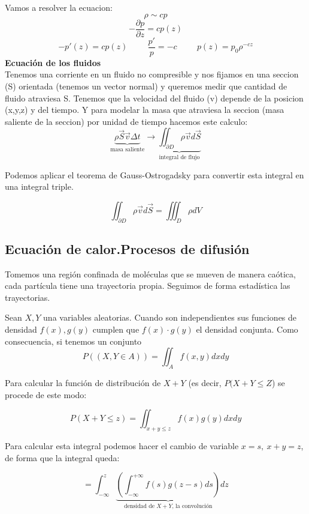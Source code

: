 \documentclass[openany]{book}
\begin{document}
Vamos a resolver la ecuacion:
$$ \rho \sim cp $$
$$ - \dfrac{\partial p}{\partial z} = cp(z) $$
$$ -p'(z)=cp(z) \hspace{1cm} \dfrac{p'}{p} = -c \hspace{1cm} p(z) = p_0 \rho ^{-cz} $$
$  $\\

\textbf{Ecuación de los fluidos}\\
Tenemos una corriente en un fluido no compresible y nos fijamos en una seccion (S) orientada (tenemos un vector normal) y queremos medir que cantidad de fluido atraviesa S. Tenemos que la velocidad del fluido (v) depende de la posicion (x,y,z) y del tiempo. Y para modelar la masa que atraviesa la seccion (masa saliente de la seccion) por unidad de tiempo hacemos este calculo:
$$ \underbrace{\rho \overrightarrow{S} \overrightarrow{v}\Delta t }_{\text{masa saliente}} \to \underbrace{\iint_{\partial D} \rho \overrightarrow{v}d \overrightarrow{S}}_{\text{integral de flujo}} $$

Podemos aplicar el teorema de Gauss-Ostrogadsky para convertir esta integral en una integral triple.

$$ \iint_{\partial D}\rho \overrightarrow{v}d \overrightarrow{S} = \iiint_D \rho dV  $$

\subsection{Ecuación de calor.Procesos de difusión}

Tomemos una región confinada de moléculas que se mueven de manera caótica, cada partícula tiene una trayectoria propia. Seguimos de forma estadística las trayectorias.

Sean $ X,Y $ una variables aleatorias. Cuando son independientes sus funciones de densidad $ f(x),g(y) $ cumplen que $ f(x)\cdot g(y) $ el densidad conjunta.
Como consecuencia, si tenemos un conjunto
$$P((X,Y \in A)) = \iint_A f(x,y) dxdy $$

Para calcular la función de distribución de $ X+Y $ (es decir, $P(X+Y \leq Z$) se procede de este modo:

$$ P (X+Y \leq z) = \iint_{x+y \leq  z} f(x)g(y)dxdy $$

Para calcular esta integral podemos hacer el cambio de variable $ x=s,\ x+y=z $, de forma que la integral queda:

$$ = \int_{-\infty}^{z}\underbrace{ \left(\int_{-\infty}^{+\infty}f(s)g(z-s)ds \right) }_{ \text{densidad de }X+Y\text{, la convolución} } dz $$
\end{document}
